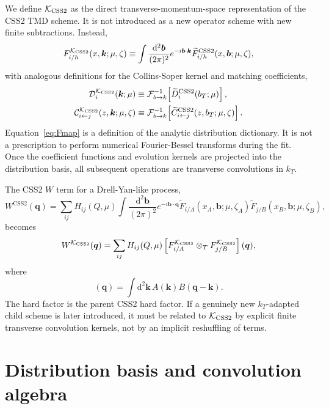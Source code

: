 \documentclass[aps,prd,preprint,superscriptaddress,nofootinbib,longbibliography]{revtex4-2}
\newcommand{\dd}{\mathrm d}
\newcommand{\bb}{\bm b}
\newcommand{\bk}{\bm k}
\newcommand{\bq}{\bm q}
\newcommand{\KCSS}{\mathcal K_{\rm CSS2}}
\newcommand{\CSS}{\mathrm{CSS2}}
\newcommand{\ot}{\otimes_T}
\newcommand{\tilF}{\widetilde F}
\newcommand{\tilC}{\widetilde C}
\newcommand{\tilD}{\widetilde D}
\begin{document}
We define $\KCSS$ as the direct transverse-momentum-space representation of the CSS2 TMD scheme.  It is not introduced as a new operator scheme with new finite subtractions.  Instead,
\begin{equation}
  F_{i/h}^{\KCSS}(x,\bk;\mu,\zeta)
  \equiv
  \int \frac{\dd^2\bb}{(2\pi)^2}
  e^{-i\bb\cdot\bk}
  \tilF_{i/h}^{\CSS}(x,\bb;\mu,\zeta),
  \label{eq:Fmap}
\end{equation}
with analogous definitions for the Collins-Soper kernel and matching coefficients,
\begin{align}
  \mathcal D_i^{\KCSS}(\bk;\mu)
  &\equiv \mathcal F^{-1}_{b\to k}\!\left[\tilD_i^{\CSS}(b_T;\mu)\right],
  \\
  \mathcal C_{i\leftarrow j}^{\KCSS}(z,\bk;\mu,\zeta)
  &\equiv \mathcal F^{-1}_{b\to k}\!\left[\tilC_{i\leftarrow j}^{\CSS}(z,b_T;\mu,\zeta)\right].
\end{align}
Equation~\eqref{eq:Fmap} is a definition of the analytic distribution dictionary.  It is not a prescription to perform numerical Fourier-Bessel transforms during the fit.  Once the coefficient functions and evolution kernels are projected into the distribution basis, all subsequent operations are transverse convolutions in $k_T$.

The CSS2 $W$ term for a Drell-Yan-like process,
\begin{equation}
  W^{\CSS}(\bq)
  =\sum_{ij} H_{ij}(Q,\mu)
   \int \frac{\dd^2\bb}{(2\pi)^2}e^{-i\bb\cdot\bq}
   \tilF_{i/A}(x_A,\bb;\mu,\zeta_A)
   \tilF_{j/B}(x_B,\bb;\mu,\zeta_B),
\end{equation}
becomes
\begin{equation}
  W^{\KCSS}(\bq)
  =\sum_{ij} H_{ij}(Q,\mu)
  \left[F_{i/A}^{\KCSS}\ot F_{j/B}^{\KCSS}\right](\bq),
  \label{eq:Wkcss}
\end{equation}
where
\begin{equation}
  [A\ot B](\bq)=\int\dd^2\bk\,A(\bk)B(\bq-\bk).
\end{equation}
The hard factor is the parent CSS2 hard factor.  If a genuinely new $k_T$-adapted child scheme is later introduced, it must be related to $\KCSS$ by explicit finite transverse convolution kernels, not by an implicit reshuffling of terms.

\section{Distribution basis and convolution algebra}
\end{document}
